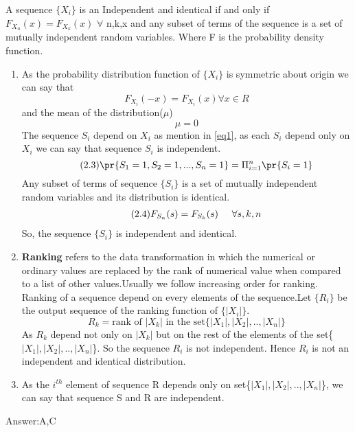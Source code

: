 
A sequence $\{X_{i}\}$ is an Independent and identical if and only if 
$F_{X_{n}}(x)=F_{X_{k}}(x)$
$\forall$ n,k,x and any subset of terms of the sequence is a set of mutually independent random variables.
Where F is the probability density function.
\begin{enumerate}
\item As the probability distribution function of $\{X_{i}\}$ is symmetric about origin we can say that 
\begin{equation}
\tag{2.1}
  F_{X_{i}}(-x)=F_{X_{i}}(x)    \forall x \in R  
\end{equation}
and the mean of the distribution($\mu$)
\begin{equation}
    \tag{2.2}
    \mu=0
\end{equation}
The sequence $S_{i}$ depend on $X_{i}$ as mention in \ref{eq1}, as each $S_{i}$ depend only on $X_{i}$ we can say that sequence $S_{i}$ is independent.
\begin{equation}
    \tag{2.3}
\pr{S_{1}=1,S_{2}=1,...,S_{n}=1}=\Pi_{i=1}^{n}\pr{S_{i}=1}
\end{equation}
Any subset of terms of sequence $\{S_{i}\}$ is a set of mutually independent random variables and its distribution is identical. 
\begin{align}
    \tag{2.4}
    F_{S_{n}}(s)=F_{S_{k}}(s) \hspace{0.5cm} \forall s,k,n
\end{align}
So, the sequence $\{S_{i}\}$ is independent and identical.
\item 
\textbf{Ranking} refers to the data transformation in which the numerical or ordinary values are replaced by the rank of numerical value when compared to a list of other values.Usually we follow increasing order for ranking.\\
Ranking of a sequence depend on every elements of the sequence.Let $\{R_{i}\}$ be the output sequence of the ranking function of $\{|X_{i}|\}$.
\begin{equation}
    \tag{2.5}
    R_{k}=\text{rank of $|X_{k}|$ in the set\{$|X_{1}|,|X_{2}|,..,|X_{n}|$\}}
\end{equation}
As $R_{k}$ depend not only on $|X_{k}|$ but on the rest of the elements of the set\{$|X_{1}|,|X_{2}|,..,|X_{n}|$\}. So the sequence $R_{i}$ is not independent. Hence $R_{i}$ is not an independent and identical distribution.
\item 
As the $i^{th}$ element of sequence R depends only on set\{$|X_{1}|,|X_{2}|,..,|X_{n}|$\}, we can say that sequence S and R are independent.
\end{enumerate}
Answer:A,C